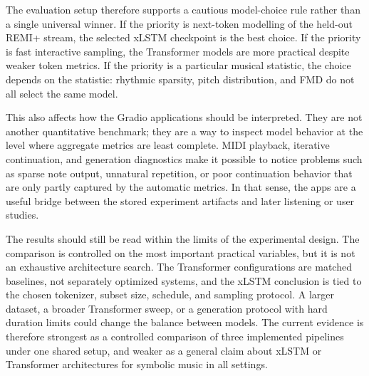 The evaluation setup therefore supports a cautious model-choice rule rather
than a single universal winner. If the priority is next-token modelling of the
held-out REMI+ stream, the selected xLSTM checkpoint is the best choice. If the
priority is fast interactive sampling, the Transformer models are more practical
despite weaker token metrics. If the priority is a particular musical statistic,
the choice depends on the statistic: rhythmic sparsity, pitch distribution, and
FMD do not all select the same model.

This also affects how the Gradio applications should be interpreted. They are
not another quantitative benchmark; they are a way to inspect model behavior at
the level where aggregate metrics are least complete. MIDI playback, iterative
continuation, and generation diagnostics make it possible to notice problems
such as sparse note output, unnatural repetition, or poor continuation behavior
that are only partly captured by the automatic metrics. In that sense, the apps
are a useful bridge between the stored experiment artifacts and later listening
or user studies.

The results should still be read within the limits of the experimental design.
The comparison is controlled on the most important practical variables, but it
is not an exhaustive architecture search. The Transformer configurations are
matched baselines, not separately optimized systems, and the xLSTM conclusion is
tied to the chosen tokenizer, subset size, schedule, and sampling protocol. A
larger dataset, a broader Transformer sweep, or a generation protocol with hard
duration limits could change the balance between models. The current evidence is
therefore strongest as a controlled comparison of three implemented pipelines
under one shared setup, and weaker as a general claim about xLSTM or
Transformer architectures for symbolic music in all settings.
